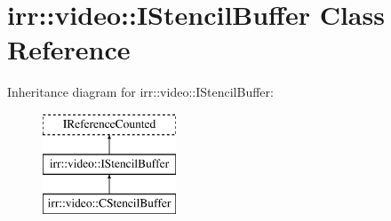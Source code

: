 \hypertarget{classirr_1_1video_1_1_i_stencil_buffer}{\section{irr\-:\-:video\-:\-:I\-Stencil\-Buffer Class Reference}
\label{classirr_1_1video_1_1_i_stencil_buffer}
}
Inheritance diagram for irr\-:\-:video\-:\-:I\-Stencil\-Buffer\-:\begin{figure}[H]
\begin{center}
\leavevmode
\includegraphics[height=3.000000cm]{classirr_1_1video_1_1_i_stencil_buffer}
\end{center}
\end{figure}
